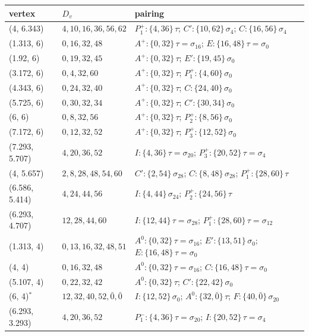 \documentclass[11pt]{article}
\theoremstyle{definition}
\theoremstyle{remark}
\begin{document}
{\small
\begin{longtable}{lll}
\toprule
vertex & $D_v$ & pairing\\
\midrule
\endhead
(4, 6.343) & $4,10,16,36,56,62$ & $P_1^{+}\!:\{4,36\}\,\tau$; $C'\!:\{10,62\}\,\sigma_{4}$; $C\!:\{16,56\}\,\sigma_{4}$ \\
(1.313, 6) & $0,16,32,48$ & $A^{+}\!:\{0,32\}\,\tau{=}\sigma_{16}$; $E\!:\{16,48\}\,\tau{=}\sigma_{0}$ \\
(1.92, 6) & $0,19,32,45$ & $A^{+}\!:\{0,32\}\,\tau$; $E'\!:\{19,45\}\,\sigma_{0}$ \\
(3.172, 6) & $0,4,32,60$ & $A^{+}\!:\{0,32\}\,\tau$; $P_1^{+}\!:\{4,60\}\,\sigma_{0}$ \\
(4.343, 6) & $0,24,32,40$ & $A^{+}\!:\{0,32\}\,\tau$; $C\!:\{24,40\}\,\sigma_{0}$ \\
(5.725, 6) & $0,30,32,34$ & $A^{+}\!:\{0,32\}\,\tau$; $C'\!:\{30,34\}\,\sigma_{0}$ \\
(6, 6) & $0,8,32,56$ & $A^{+}\!:\{0,32\}\,\tau$; $P_2^{+}\!:\{8,56\}\,\sigma_{0}$ \\
(7.172, 6) & $0,12,32,52$ & $A^{+}\!:\{0,32\}\,\tau$; $P_3^{+}\!:\{12,52\}\,\sigma_{0}$ \\
(7.293, 5.707) & $4,20,36,52$ & $I\!:\{4,36\}\,\tau{=}\sigma_{20}$; $P_3^{+}\!:\{20,52\}\,\tau{=}\sigma_{4}$ \\
(4, 5.657) & $2,8,28,48,54,60$ & $C'\!:\{2,54\}\,\sigma_{28}$; $C\!:\{8,48\}\,\sigma_{28}$; $P_1^{+}\!:\{28,60\}\,\tau$ \\
(6.586, 5.414) & $4,24,44,56$ & $I\!:\{4,44\}\,\sigma_{24}$; $P_2^{+}\!:\{24,56\}\,\tau$ \\
(6.293, 4.707) & $12,28,44,60$ & $I\!:\{12,44\}\,\tau{=}\sigma_{28}$; $P_1^{+}\!:\{28,60\}\,\tau{=}\sigma_{12}$ \\
(1.313, 4) & $0,13,16,32,48,51$ & $A^{0}\!:\{0,32\}\,\tau{=}\sigma_{16}$; $E'\!:\{13,51\}\,\sigma_{0}$; $E\!:\{16,48\}\,\tau{=}\sigma_{0}$ \\
(4, 4) & $0,16,32,48$ & $A^{0}\!:\{0,32\}\,\tau{=}\sigma_{16}$; $C\!:\{16,48\}\,\tau{=}\sigma_{0}$ \\
(5.107, 4) & $0,22,32,42$ & $A^{0}\!:\{0,32\}\,\tau$; $C'\!:\{22,42\}\,\sigma_{0}$ \\
(6, 4)$^{\ast}$ & $12,32,40,52,\bar 0,\bar 0$ & $I\!:\{12,52\}\,\sigma_{0}$; $A^{0}\!:\{32,\bar 0\}\,\tau$; $F\!:\{40,\bar 0\}\,\sigma_{20}$ \\
(6.293, 3.293) & $4,20,36,52$ & $P_1^{-}\!:\{4,36\}\,\tau{=}\sigma_{20}$; $I\!:\{20,52\}\,\tau{=}\sigma_{4}$ \\

\end{longtable}}
\end{document}
